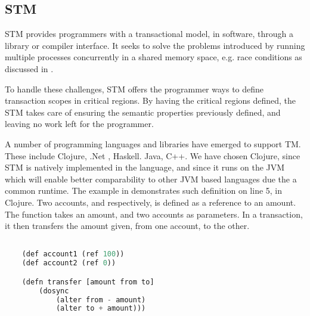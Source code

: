\subsection{\acl{STM}}
\ac{STM} provides programmers with a transactional model, in software, through a library or compiler interface\cite{herlihy2011tm}. It seeks to solve the problems introduced by running multiple processes concurrently in a shared memory space, e.g. race conditions as discussed in . 

To handle these challenges, \ac{STM} offers the programmer ways to define transaction scopes in critical regions. By having the critical regions defined, the \ac{STM} takes care of ensuring the semantic properties previously defined, and leaving no work left for the programmer.

A number of programming languages and libraries have emerged to support TM. These include Clojure, .Net , Haskell. Java, C++. We have chosen Clojure, since \ac{STM} is natively implemented in the language, and since it runs on the \ac{JVM} which will enable better comparability to other \ac{JVM} based languages due the a common runtime. The example in  demonstrates such definition on line 5, in Clojure. Two accounts,  and  respectively, is defined as a reference to an amount. The function  takes an amount, and two accounts as parameters. In a transaction, it then transfers the amount given, from one account, to the other.

\begin{lstlisting}[label=lst:stmexample,
  caption={STM in Clojure},
  language=Lisp,  
  showspaces=false,
  showtabs=false,
  breaklines=true,
  showstringspaces=false,
  breakatwhitespace=true,
  commentstyle=\color{greencomments},
  keywordstyle=\color{bluekeywords},
  stringstyle=\color{redstrings}]  % Start your code-block

	(def account1 (ref 100))
	(def account2 (ref 0))

	(defn transfer [amount from to]
    	(dosync
    		(alter from - amount)
    		(alter to + amount)))
       
\end{lstlisting}


